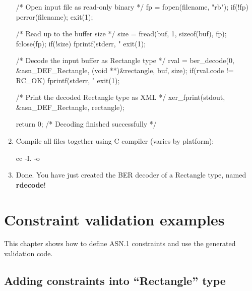 \documentclass[english,oneside,12pt]{book}
\begin{document}
\begin{enumerate}
\begin{codesample}[basicstyle=\scriptsize\listingfont]
{    /* Open input file as read-only binary */
    fp = fopen(filename, "rb");
    if(!fp) {
        perror(filename);
        exit(1);
    }

    /* Read up to the buffer size */
    size = fread(buf, 1, sizeof(buf), fp);
    fclose(fp);
    if(!size) {
        fprintf(stderr, "%
        exit(1);
    }

    /* Decode the input buffer as Rectangle type */
    rval = ber_decode(0, &asn_DEF_Rectangle, (void **)&rectangle, buf, size);
    if(rval.code != RC_OK) {
        fprintf(stderr, "%
        exit(1);
    }

    /* Print the decoded Rectangle type as XML */
    xer_fprint(stdout, &asn_DEF_Rectangle, rectangle);

    return 0; /* Decoding finished successfully */
}
\end{codesample}
\item Compile all files together using C compiler (varies by platform):

\begin{bash}
cc -I. -o %
\end{bash}
\item Done. You have just created the BER decoder of a Rectangle type,
named \textbf{rdecode}!
\end{enumerate}

\chapter{Constraint validation examples}

This chapter shows how to define ASN.1 constraints and use the generated
validation code.


\section{Adding constraints into ``Rectangle'' type}
\end{document}
